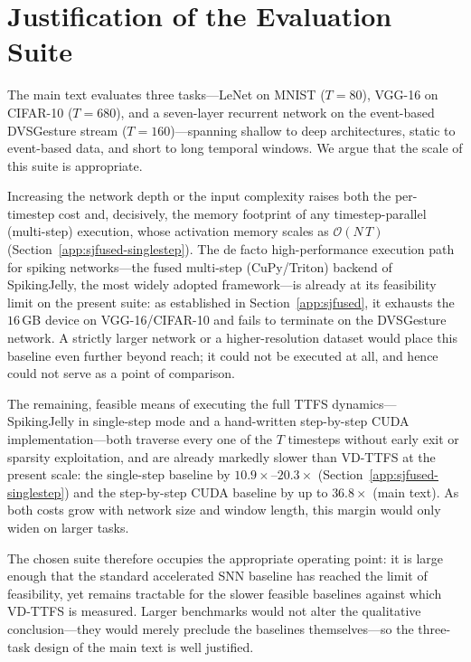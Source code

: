 \documentclass[runningheads]{llncs}
\begin{document}
\section{Justification of the Evaluation Suite}\label{app:tasks}
The main text evaluates three tasks---LeNet on MNIST ($T{=}80$), VGG-16 on
CIFAR-10 ($T{=}680$), and a seven-layer recurrent network on the event-based
DVSGesture stream ($T{=}160$)---spanning shallow to deep architectures, static to
event-based data, and short to long temporal windows. We argue that the scale of
this suite is appropriate.

Increasing the network depth or the input complexity raises both the per-timestep
cost and, decisively, the memory footprint of any timestep-parallel (multi-step)
execution, whose activation memory scales as $\mathcal{O}(N\,T)$
(Section~\ref{app:sjfused-singlestep}). The de facto high-performance execution
path for spiking networks---the fused multi-step (CuPy/Triton) backend of
SpikingJelly, the most widely adopted framework---is already at its feasibility
limit on the present suite: as established in Section~\ref{app:sjfused}, it
exhausts the $16$\,GB device on VGG-16/CIFAR-10 and fails to terminate on the
DVSGesture network. A strictly larger network or a higher-resolution dataset would
place this baseline even further beyond reach; it could not be executed at all, and
hence could not serve as a point of comparison.

The remaining, feasible means of executing the full TTFS dynamics---SpikingJelly in
single-step mode and a hand-written step-by-step CUDA implementation---both
traverse every one of the $T$ timesteps without early exit or sparsity
exploitation, and are already markedly slower than VD-TTFS at the present scale:
the single-step baseline by $10.9\times$--$20.3\times$
(Section~\ref{app:sjfused-singlestep}) and the step-by-step CUDA baseline by up to
$36.8\times$ (main text). As both costs grow with network size and window length,
this margin would only widen on larger tasks.

The chosen suite therefore occupies the appropriate operating point: it is large
enough that the standard accelerated SNN baseline has reached the limit of
feasibility, yet remains tractable for the slower feasible baselines against which
VD-TTFS is measured. Larger benchmarks would not alter the qualitative
conclusion---they would merely preclude the baselines themselves---so the
three-task design of the main text is well justified.
\end{document}
